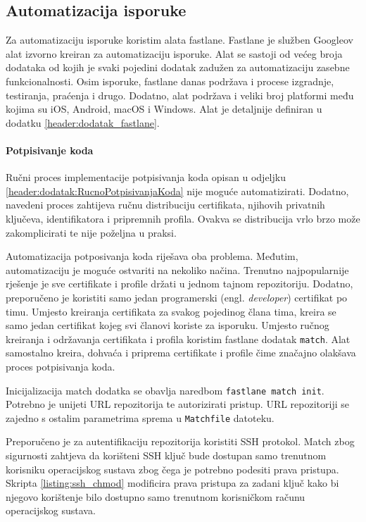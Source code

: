 \documentclass[times, utf8, diplomski, numeric]{fer}
\newcommand{\eng}[1]{(engl. \textit{#1})}
\begin{document}
\begin{appendices}
\subsection{Automatizacija isporuke}

Za automatizaciju isporuke koristim alata fastlane. Fastlane je služben Googleov alat izvorno kreiran za automatizaciju isporuke. Alat se sastoji od većeg broja dodataka od kojih je svaki pojedini dodatak zadužen za automatizaciju zasebne funkcionalnosti. Osim isporuke, fastlane danas podržava i procese izgradnje, testiranja, praćenja i drugo. Dodatno, alat podržava i veliki broj platformi među kojima su iOS, Android, macOS i Windows. Alat je detaljnije definiran u dodatku \ref{header:dodatak_fastlane}.

\paragraph{Potpisivanje koda} \label{header:dodatak:AutomatizacijaPotpisivanjaKoda}

Ručni proces implementacije potpisivanja koda opisan u odjeljku \ref{header:dodatak:RucnoPotpisivanjaKoda} nije moguće automatizirati. Dodatno, navedeni proces zahtijeva ručnu distribuciju certifikata, njihovih privatnih ključeva, identifikatora i pripremnih profila. Ovakva se distribucija vrlo brzo može zakomplicirati te nije poželjna u praksi.

Automatizacija potposivanja koda riješava oba problema. Međutim, automatizaciju je moguće ostvariti na nekoliko načina. Trenutno najpopularnije rješenje je sve certifikate i profile držati u jednom tajnom repozitoriju\citep{codesigningguide}. Dodatno, preporučeno je koristiti samo jedan programerski \eng{developer} certifikat po timu. Umjesto kreiranja certifikata za svakog pojedinog člana tima, kreira se samo jedan certifikat kojeg svi članovi koriste za isporuku. Umjesto ručnog kreiranja i održavanja certifikata i profila koristim fastlane dodatak \verb|match|\citep{fastlane:match}. Alat samostalno kreira, dohvaća i priprema certifikate i profile čime značajno olakšava proces potpisivanja koda.

Inicijalizacija match dodatka se obavlja naredbom \verb|fastlane match init|. Potrebno je unijeti URL repozitorija te autorizirati pristup. URL repozitoriji se zajedno s ostalim parametrima sprema u \verb|Matchfile| datoteku.

Preporučeno je za autentifikaciju repozitorija koristiti SSH protokol. Match zbog sigurnosti zahtjeva da korišteni SSH ključ bude dostupan samo trenutnom korisniku operacijskog sustava zbog čega je potrebno podesiti prava pristupa. Skripta \ref{listing:ssh_chmod} modificira prava pristupa za zadani ključ kako bi njegovo korištenje bilo dostupno samo trenutnom korisničkom računu operacijskog sustava.


\end{appendices}
\end{document}
